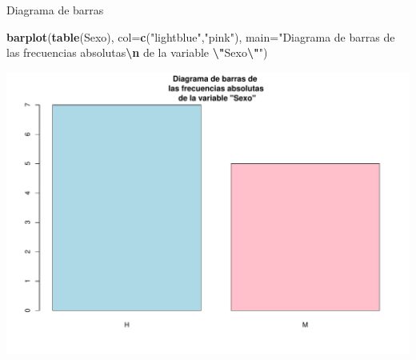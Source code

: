 \documentclass[
  ignorenonframetext,
]{beamer}
\newenvironment{Shaded}{\begin{snugshade}}{\end{snugshade}}
\newcommand{\AttributeTok}[1]{\textcolor[rgb]{0.13,0.29,0.53}{#1}}
\newcommand{\FunctionTok}[1]{\textcolor[rgb]{0.13,0.29,0.53}{\textbf{#1}}}
\newcommand{\NormalTok}[1]{#1}
\newcommand{\SpecialCharTok}[1]{\textcolor[rgb]{0.81,0.36,0.00}{\textbf{#1}}}
\newcommand{\StringTok}[1]{\textcolor[rgb]{0.31,0.60,0.02}{#1}}
\begin{document}
\begin{frame}[fragile]{Diagrama de barras}
\label{diagrama-de-barras-1}
\begin{Shaded}
\begin{Highlighting}[]
\FunctionTok{barplot}\NormalTok{(}\FunctionTok{table}\NormalTok{(Sexo), }\AttributeTok{col=}\FunctionTok{c}\NormalTok{(}\StringTok{"lightblue"}\NormalTok{,}\StringTok{"pink"}\NormalTok{), }\AttributeTok{main=}\StringTok{"Diagrama de barras de }
\StringTok{las frecuencias absolutas}\SpecialCharTok{\textbackslash{}n}\StringTok{ de la variable }\SpecialCharTok{\textbackslash{}"}\StringTok{Sexo}\SpecialCharTok{\textbackslash{}"}\StringTok{"}\NormalTok{)}
\end{Highlighting}
\end{Shaded}

\includegraphics{R_base_files/figure-beamer/unnamed-chunk-85-1.pdf}
\end{frame}
\end{document}
